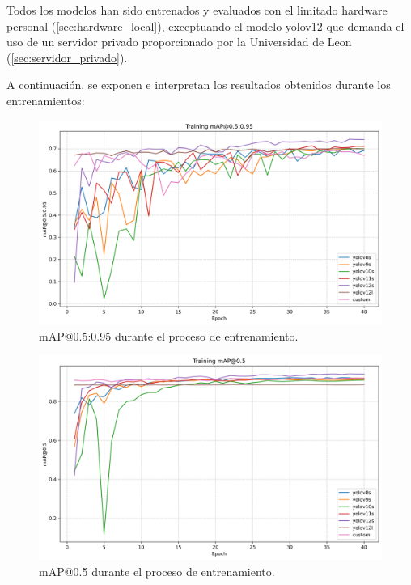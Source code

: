 \documentclass[12pt,a4paper,onecolumn,oneside]{report}
\begin{document}
Todos los modelos han sido entrenados y evaluados con el limitado hardware personal (\autoref{sec:hardware_local}), exceptuando el modelo yolov12 que demanda el uso de un servidor privado 
proporcionado por la Universidad de Leon (\autoref{sec:servidor_privado}).

A continuación, se exponen e interpretan los resultados obtenidos durante los entrenamientos:

\begin{figure}[H]
  \centering
  \includegraphics[width=1.0\textwidth]{figuras/yolo_plots/map50-95.png}
  \caption{mAP@0.5:0.95 durante el proceso de entrenamiento.}
  \label{fig:yolo_train_map95}
\end{figure}

\begin{figure}[H]
  \centering
  \includegraphics[width=1.0\textwidth]{figuras/yolo_plots/map50.png}
  \caption{mAP@0.5 durante el proceso de entrenamiento.}
  \label{fig:yolo_train_map50}
\end{figure}
\end{document}
